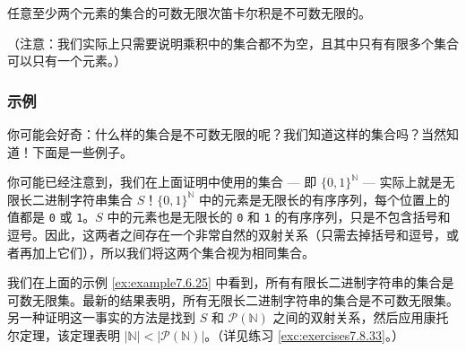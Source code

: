 \begin{corollary}
    任意至少两个元素的集合的可数无限次笛卡尔积是不可数无限的。
\end{corollary}
（注意：我们实际上只需要说明乘积中的集合都不为空，且其中只有有限多个集合可以只有一个元素。）

\subsubsection*{示例}

你可能会好奇：什么样的集合是不可数无限的呢？我们知道这样的集合吗？当然知道！下面是一些例子。\\

\begin{example}[所有无限长二进制字符串的集合]

    你可能已经注意到，我们在上面证明中使用的集合 --- 即 $\{0, 1\}^\mathbb{N}$ --- 实际上就是无限长二进制字符串集合 $S$！$\{0, 1\}^\mathbb{N}$ 中的元素是无限长的有序序列，每个位置上的值都是 \verb|0| 或 \verb|1|。$S$ 中的元素也是无限长的 \verb|0| 和 \verb|1| 的有序序列，只是不包含括号和逗号。因此，这两者之间存在一个非常自然的双射关系（只需去掉括号和逗号，或者再加上它们），所以我们将这两个集合视为相同集合。

    我们在上面的示例 \ref{ex:example7.6.25} 中看到，所有有限长二进制字符串的集合是可数无限集。最新的结果表明，所有无限长二进制字符串的集合是不可数无限集。另一种证明这一事实的方法是找到 $S$ 和 $\mathcal{P}(\mathbb{N})$ 之间的双射关系，然后应用康托尔定理，该定理表明 $|\mathbb{N}| < |\mathcal{P}(\mathbb{N})|$。（详见练习 \ref{exc:exercises7.8.33}。）
\end{example}

